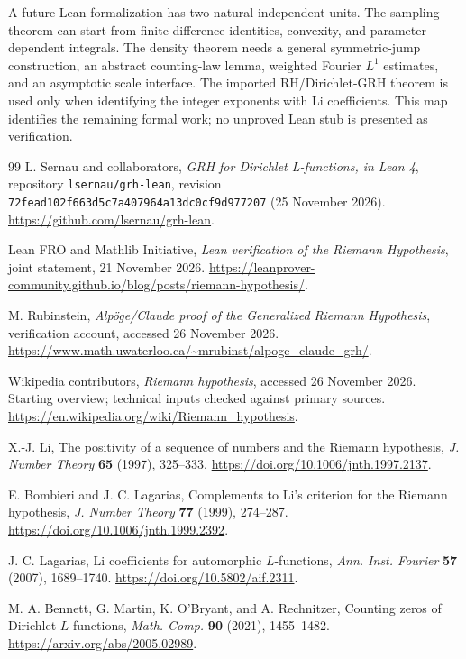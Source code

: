 \documentclass[11pt,a4paper]{article}
\theoremstyle{definition}
\theoremstyle{remark}
\numberwithin{equation}{section}
\begin{document}
A future Lean formalization has two natural independent units. The
sampling theorem can start from finite-difference identities,
convexity, and parameter-dependent integrals. The density theorem
needs a general symmetric-jump construction, an abstract counting-law
lemma, weighted Fourier $L^1$ estimates, and an asymptotic scale
interface. The imported RH/Dirichlet-GRH theorem is used only when
identifying the integer exponents with Li coefficients. This map
identifies the remaining formal work; no unproved Lean stub is
presented as verification.

\begingroup
\small
\begin{thebibliography}{99}
L. Sernau and collaborators,
\emph{GRH for Dirichlet L-functions, in Lean 4},
repository \texttt{lsernau/grh-lean}, revision
\texttt{72fead102f663d5c7a407964a13dc0cf9d977207} (25 November 2026).
\url{https://github.com/lsernau/grh-lean}.

Lean FRO and Mathlib Initiative,
\emph{Lean verification of the Riemann Hypothesis},
joint statement, 21 November 2026.
\url{https://leanprover-community.github.io/blog/posts/riemann-hypothesis/}.

M. Rubinstein, \emph{Alp\"oge/Claude proof of the Generalized Riemann
Hypothesis}, verification account, accessed 26 November 2026.
\url{https://www.math.uwaterloo.ca/~mrubinst/alpoge_claude_grh/}.

Wikipedia contributors, \emph{Riemann hypothesis}, accessed
26 November 2026. Starting overview; technical inputs checked against
primary sources. \url{https://en.wikipedia.org/wiki/Riemann_hypothesis}.

X.-J. Li, The positivity of a sequence of numbers and the Riemann
hypothesis, \emph{J. Number Theory} \textbf{65} (1997), 325--333.
\url{https://doi.org/10.1006/jnth.1997.2137}.

E. Bombieri and J. C. Lagarias, Complements to Li's criterion for the
Riemann hypothesis, \emph{J. Number Theory} \textbf{77} (1999), 274--287.
\url{https://doi.org/10.1006/jnth.1999.2392}.

J. C. Lagarias, Li coefficients for automorphic $L$-functions,
\emph{Ann. Inst. Fourier} \textbf{57} (2007), 1689--1740.
\url{https://doi.org/10.5802/aif.2311}.

M. A. Bennett, G. Martin, K. O'Bryant, and A. Rechnitzer,
Counting zeros of Dirichlet $L$-functions,
\emph{Math. Comp.} \textbf{90} (2021), 1455--1482.
\url{https://arxiv.org/abs/2005.02989}.


\end{thebibliography}
\end{document}
